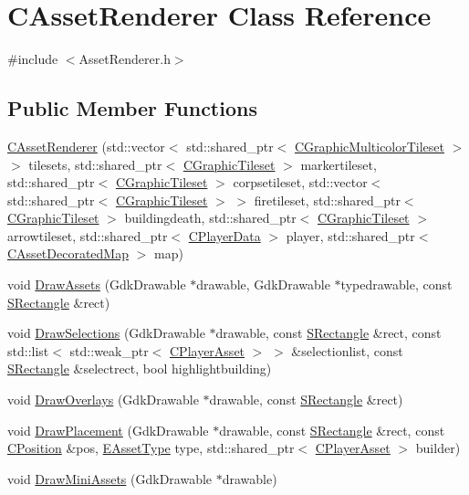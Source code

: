 \hypertarget{classCAssetRenderer}{}\section{C\+Asset\+Renderer Class Reference}
\label{classCAssetRenderer}


{\ttfamily \#include $<$Asset\+Renderer.\+h$>$}

\subsection*{Public Member Functions}
\begin{DoxyCompactItemize}
\item 
\hyperlink{classCAssetRenderer_a8ac3835671efb08a1793b2fe5af2b187}{C\+Asset\+Renderer} (std\+::vector$<$ std\+::shared\+\_\+ptr$<$ \hyperlink{classCGraphicMulticolorTileset}{C\+Graphic\+Multicolor\+Tileset} $>$ $>$ tilesets, std\+::shared\+\_\+ptr$<$ \hyperlink{classCGraphicTileset}{C\+Graphic\+Tileset} $>$ markertileset, std\+::shared\+\_\+ptr$<$ \hyperlink{classCGraphicTileset}{C\+Graphic\+Tileset} $>$ corpsetileset, std\+::vector$<$ std\+::shared\+\_\+ptr$<$ \hyperlink{classCGraphicTileset}{C\+Graphic\+Tileset} $>$ $>$ firetileset, std\+::shared\+\_\+ptr$<$ \hyperlink{classCGraphicTileset}{C\+Graphic\+Tileset} $>$ buildingdeath, std\+::shared\+\_\+ptr$<$ \hyperlink{classCGraphicTileset}{C\+Graphic\+Tileset} $>$ arrowtileset, std\+::shared\+\_\+ptr$<$ \hyperlink{classCPlayerData}{C\+Player\+Data} $>$ player, std\+::shared\+\_\+ptr$<$ \hyperlink{classCAssetDecoratedMap}{C\+Asset\+Decorated\+Map} $>$ map)
\item 
void \hyperlink{classCAssetRenderer_a5497eeabf031cbebbaa1c92c959a9c47}{Draw\+Assets} (Gdk\+Drawable $\ast$drawable, Gdk\+Drawable $\ast$typedrawable, const \hyperlink{structSRectangle}{S\+Rectangle} \&rect)
\item 
void \hyperlink{classCAssetRenderer_ad9e2ab45919abbec23871b85a95ba8cf}{Draw\+Selections} (Gdk\+Drawable $\ast$drawable, const \hyperlink{structSRectangle}{S\+Rectangle} \&rect, const std\+::list$<$ std\+::weak\+\_\+ptr$<$ \hyperlink{classCPlayerAsset}{C\+Player\+Asset} $>$ $>$ \&selectionlist, const \hyperlink{structSRectangle}{S\+Rectangle} \&selectrect, bool highlightbuilding)
\item 
void \hyperlink{classCAssetRenderer_a1d2941f9b7aa116f578642c62410bb4a}{Draw\+Overlays} (Gdk\+Drawable $\ast$drawable, const \hyperlink{structSRectangle}{S\+Rectangle} \&rect)
\item 
void \hyperlink{classCAssetRenderer_af9cdf65db6c87c8cfd94fc4a84066b3e}{Draw\+Placement} (Gdk\+Drawable $\ast$drawable, const \hyperlink{structSRectangle}{S\+Rectangle} \&rect, const \hyperlink{classCPosition}{C\+Position} \&pos, \hyperlink{GameDataTypes_8h_a5600d4fc433b83300308921974477fec}{E\+Asset\+Type} type, std\+::shared\+\_\+ptr$<$ \hyperlink{classCPlayerAsset}{C\+Player\+Asset} $>$ builder)
\item 
void \hyperlink{classCAssetRenderer_aeae64eefc83960997f372880140aaaa5}{Draw\+Mini\+Assets} (Gdk\+Drawable $\ast$drawable)
\end{DoxyCompactItemize}

